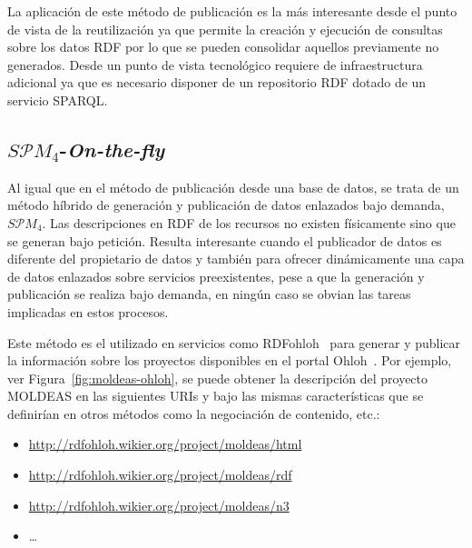 La aplicación de este método de publicación es la más interesante desde el punto de vista
de la reutilización ya que permite la creación y ejecución de consultas sobre los datos RDF por lo que
se pueden consolidar aquellos previamente no generados. Desde un punto de vista tecnológico requiere
de infraestructura adicional ya que es necesario disponer de un repositorio RDF dotado de un servicio SPARQL.

\subsection{$S\mathcal{P}M_{4}$-\textit{On-the-fly}}
Al igual que en el método de publicación desde una base de datos, se trata de un método híbrido
de generación y publicación de datos enlazados bajo demanda, $S\mathcal{P}M_{4}$. Las descripciones en \gls{RDF} de los
recursos no existen físicamente sino que se generan bajo petición. Resulta interesante cuando
el publicador de datos es diferente del propietario de datos y también para ofrecer
dinámicamente una capa de datos enlazados sobre servicios preexistentes, pese a que la generación
y publicación se realiza bajo demanda, en ningún caso se obvian las tareas implicadas en estos procesos.

Este método es el utilizado en servicios como RDFohloh~\cite{Ferndez08rdfohloh} para generar y publicar la información
sobre los proyectos disponibles en el portal Ohloh~\cite{ohloh}. Por ejemplo, ver Figura~\ref{fig:moldeas-ohloh}, se puede obtener la descripción
del proyecto \gls{MOLDEAS} en las siguientes \gls{URI}s y bajo las mismas características que se definirían en otros métodos como la negociación de contenido, etc.:
\begin{itemize}
 \item \url{http://rdfohloh.wikier.org/project/moldeas/html}
 \item \url{http://rdfohloh.wikier.org/project/moldeas/rdf}
 \item \url{http://rdfohloh.wikier.org/project/moldeas/n3}
 \item \ldots
\end{itemize}


